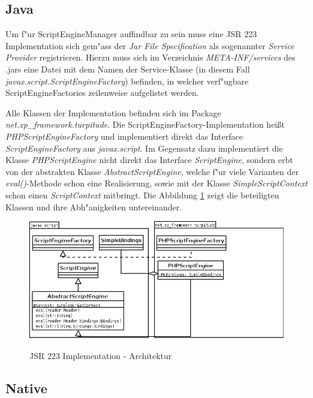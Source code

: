 \subsection{Java}
\label{sec:chap1:design:java}

Um f"ur ScriptEngineManager auffindbar zu sein muss eine JSR 223 Implementation sich gem"ass der \emph{Jar File Specification} \cite{JARSPEC} 
als sogenannter \emph{Service Provider} registrieren. Hierzu muss sich im Verzeichnis \emph{META-INF/services} des .jars eine Datei
mit dem Namen der Service-Klasse (in diesem Fall \emph{javax.script.ScriptEngineFactory}) befinden, in welcher verf"ugbare 
ScriptEngineFactories zeilenweise aufgelistet werden.

Alle Klassen der Implementation befinden sich im Package \emph{net.xp\_framework.turpitude}. 
Die ScriptEngineFactory-Implementation hei\ss t \emph{PHPScriptEngineFactory} und implementiert direkt das Interface 
\emph{ScriptEngineFactory} aus \emph{javax.script}. Im Gegensatz dazu implementiert die Klasse \emph{PHPScriptEngine} nicht
direkt das Interface \emph{ScriptEngine}, sondern erbt von der abstrakten Klasse \emph{AbstractScriptEngine}, welche f"ur
viele Varianten der \emph{eval()}-Methode schon eine Realisierung, sowie mit der Klasse \emph{SimpleScriptContext} schon einen 
\emph{ScriptContext} mitbringt. Die Abbildung \ref{fig:jsr223impl} zeigt die beteiligten Klassen und ihre Abh"anigkeiten untereinander.

\begin{figure}[h]
\includegraphics[width=\textwidth]{chap1/img/turpitude.png}
\caption{JSR 223 Implementation - Architektur}
\label{fig:jsr223impl}
\end{figure}


\subsection{Native}
\label{sec:chap1:design:native}


